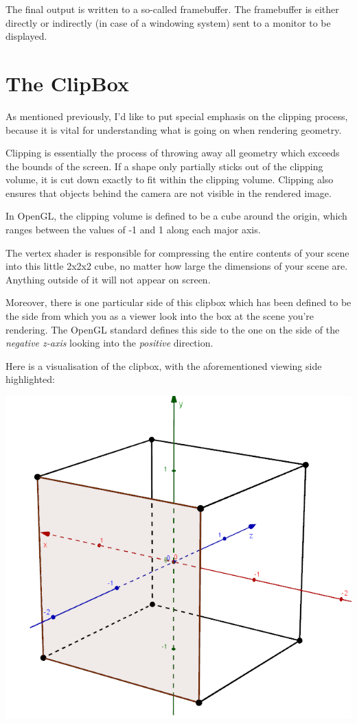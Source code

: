 The final output is written to a so-called framebuffer. The framebuffer is either directly or indirectly (in case of a windowing system) sent to a monitor to be displayed.

\section{The ClipBox}

As mentioned previously, I'd like to put special emphasis on the clipping process, because it is vital for understanding what is going on when rendering geometry.

Clipping is essentially the process of throwing away all geometry which exceeds the bounds of the screen. If a shape only partially sticks out of the clipping volume, it is cut down exactly to fit within the clipping volume. Clipping also ensures that objects behind the camera are not visible in the rendered image. 

In OpenGL, the clipping volume is defined to be a cube around the origin, which ranges between the values of -1 and 1 along each major axis.

The vertex shader is responsible for compressing the entire contents of your scene into this little 2x2x2 cube, no matter how large the dimensions of your scene are. Anything outside of it will not appear on screen.

Moreover, there is one particular side of this clipbox which has been defined to be the side from which you as a viewer look into the box at the scene you're rendering. The OpenGL standard defines this side to the one on the side of the \emph{negative z-axis} looking into the \emph{positive} direction. 

Here is a visualisation of the clipbox, with the aforementioned viewing side highlighted:

\vspace{0.5cm}
\centerline{\includegraphics[scale=0.7]{images/clipbox_corrected.png}}
\newpage
